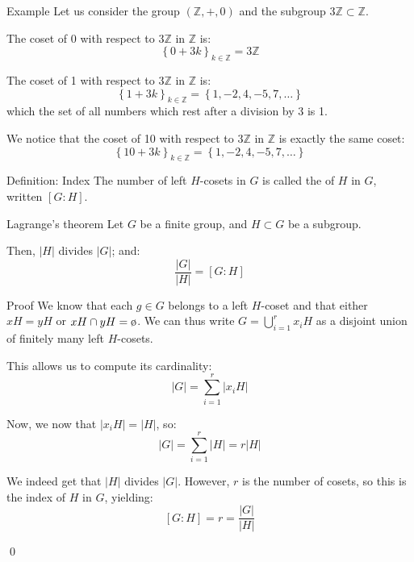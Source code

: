 \documentclass[a4paper]{article}
\begin{document}
\begin{parag}{Example}
    Let us consider the group $\left(\mathbb{Z}, +, 0\right)$ and the subgroup $3 \mathbb{Z} \subset \mathbb{Z}$.

    The coset of 0 with respect to $3\mathbb{Z}$ in $\mathbb{Z}$ is: 
    \[\left\{0 + 3k\right\}_{k \in \mathbb{Z}} = 3 \mathbb{Z}\]
    
    The coset of 1 with respect to $3\mathbb{Z}$ in $\mathbb{Z}$ is: 
    \[\left\{1 + 3k\right\}_{k \in \mathbb{Z}} = \left\{1, -2, 4, -5, 7, \ldots\right\}\]
    which the set of all numbers which rest after a division by 3 is 1.
    
    We notice that the coset of 10 with respect to $3\mathbb{Z}$ in $\mathbb{Z}$ is exactly the same coset:
    \[\left\{10 + 3k\right\}_{k \in \mathbb{Z}} = \left\{1, -2, 4, -5, 7, \ldots\right\}\]
\end{parag}

\begin{parag}{Definition: Index}
    The number of left $H$-cosets in $G$ is called the  of $H$ in $G$, written $\left[G:H\right]$. 
\end{parag}


\begin{parag}{Lagrange's theorem}
    Let $G$ be a finite group, and $H \subset G$ be a subgroup.

    Then, $\left|H\right|$ divides $\left|G\right|$; and:
    \[\frac{\left|G\right|}{\left|H\right|} = \left[G:H\right]\]

    \begin{subparag}{Proof}
        We know that each $g \in G$ belongs to a left $H$-coset and that either $x H = yH$ or $xH \cap yH = \o$. We can thus write $G = \bigcup_{i=1}^{r} x_i H$ as a disjoint union of finitely many left $H$-cosets.

        This allows us to compute its cardinality: 
        \[\left|G\right| = \sum_{i=1}^{r} \left|x_i H\right|\]
        
        Now, we now that $\left|x_i H\right| = \left|H\right|$, so: 
        \[\left|G\right| = \sum_{i=1}^{r} \left|H\right| = r\left|H\right|\]

        We indeed get that $\left|H\right|$ divides $\left|G\right|$. However, $r$ is the number of cosets, so this is the index of $H$ in $G$, yielding: 
        \[\left[G:H\right] = r = \frac{\left|G\right|}{\left|H\right|}\]
        
        \qed
    \end{subparag}
\end{parag}
\end{document}
